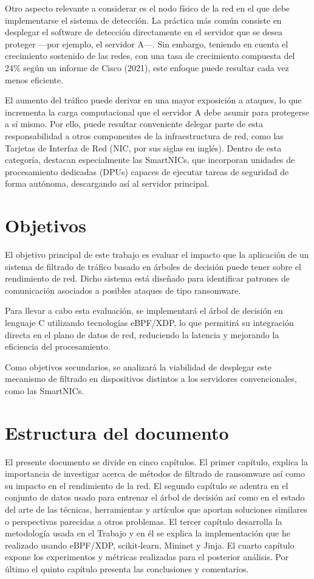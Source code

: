 Otro aspecto relevante a considerar es el nodo físico de la red en el que debe implementarse el sistema de detección. La práctica más común consiste en desplegar el software de detección directamente en el servidor que se desea proteger —por ejemplo, el servidor A—. Sin embargo, teniendo en cuenta el crecimiento sostenido de las redes, con una tasa de crecimiento compuesta del 24\% según un informe de Cisco (2021)\cite{Cisco2021}, este enfoque puede resultar cada vez menos eficiente.

El aumento del tráfico puede derivar en una mayor exposición a ataques, lo que incrementa la carga computacional que el servidor A debe asumir para protegerse a sí mismo. Por ello, puede resultar conveniente delegar parte de esta responsabilidad a otros componentes de la infraestructura de red, como las Tarjetas de Interfaz de Red (NIC, por sus siglas en inglés). Dentro de esta categoría, destacan especialmente las SmartNICs, que incorporan unidades de procesamiento dedicadas (DPUs) capaces de ejecutar tareas de seguridad de forma autónoma, descargando así al servidor principal.

\section{Objetivos}
El objetivo principal de este trabajo es evaluar el impacto que la aplicación de un sistema de filtrado de tráfico basado en árboles de decisión puede tener sobre el rendimiento de red. Dicho sistema está diseñado para identificar patrones de comunicación asociados a posibles ataques de tipo ransomware.

Para llevar a cabo esta evaluación, se implementará el árbol de decisión en lenguaje C utilizando tecnologías eBPF/XDP, lo que permitirá su integración directa en el plano de datos de red, reduciendo la latencia y mejorando la eficiencia del procesamiento.

Como objetivos secundarios, se analizará la viabilidad de desplegar este mecanismo de filtrado en dispositivos distintos a los servidores convencionales, como las SmartNICs.

\section{Estructura del documento}
El presente documento se divide en cinco capítulos. El primer capítulo, explica la importancia de investigar acerca de métodos de filtrado de ransomware así como su impacto en el rendimiento de la red. El segundo capítulo se adentra en el conjunto de datos usado para entrenar el árbol de decisión así como en el estado del arte de las técnicas, herramientas y artículos que aportan soluciones similares o perspectivas parecidas a otros problemas. El tercer capítulo desarrolla la metodología usada en el Trabajo y en él se explica la implementación que he realizado usando eBPF/XDP, scikit-learn, Mininet y Jinja. El cuarto capítulo expone los experimentos y métricas realizadas para el posterior análisis. Por último el quinto capítulo presenta las conclusiones y comentarios.  
